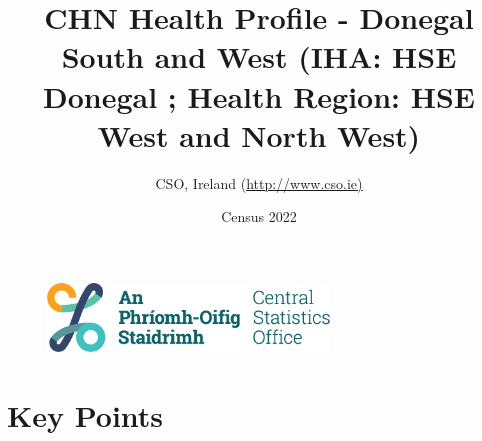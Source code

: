 \documentclass{article}
\title{CHN Health Profile - Donegal South and West (IHA: HSE Donegal ;  Health Region: HSE West and North West) }
\date{Census 2022}
\author{CSO, Ireland  (\url{http://www.cso.ie)}}
\begin{document}


\begin{figure}
	\centering
\includegraphics[width =75mm]{../figures/CSO_Logo.png}
\end{figure}

				 
		   
						  
														  
																																													
												 
			 
\maketitle
					
													   
				 
						 
																																																																											   
				 
				  
  \pagebreak
    	    \tableofcontents

\pagebreak


\section{Key Points}
\end{document}
